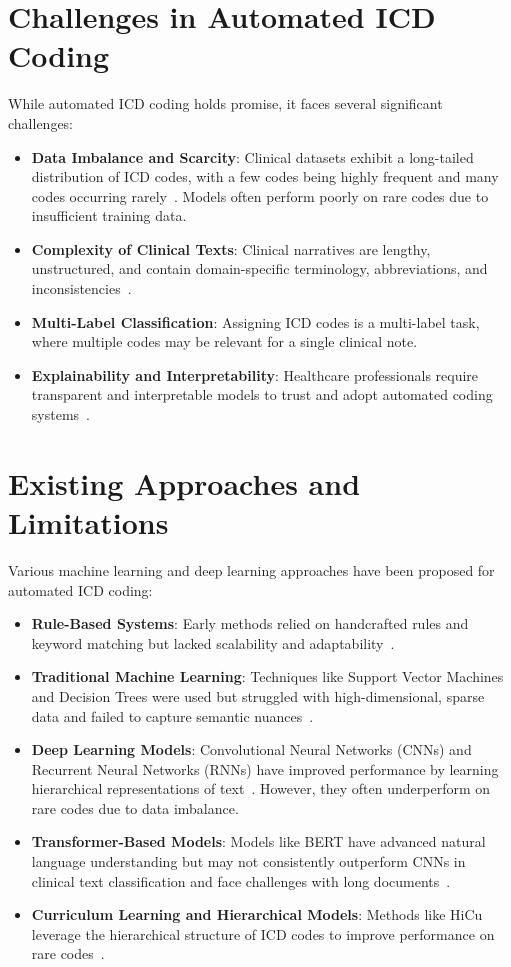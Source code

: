 \documentclass[12pt,a4paper]{report}
\begin{document}
\section{Challenges in Automated ICD Coding}
While automated ICD coding holds promise, it faces several significant challenges:
\begin{itemize}
    \item \textbf{Data Imbalance and Scarcity}: Clinical datasets exhibit a long-tailed distribution of ICD codes, with a few codes being highly frequent and many codes occurring rarely~\cite{rios2018few}. Models often perform poorly on rare codes due to insufficient training data.
    \item \textbf{Complexity of Clinical Texts}: Clinical narratives are lengthy, unstructured, and contain domain-specific terminology, abbreviations, and inconsistencies~\cite{wrenn2010quantifying}.
    \item \textbf{Multi-Label Classification}: Assigning ICD codes is a multi-label task, where multiple codes may be relevant for a single clinical note.
    \item \textbf{Explainability and Interpretability}: Healthcare professionals require transparent and interpretable models to trust and adopt automated coding systems~\cite{holzinger2017we}.
\end{itemize}

\section{Existing Approaches and Limitations}
Various machine learning and deep learning approaches have been proposed for automated ICD coding:
\begin{itemize}
    \item \textbf{Rule-Based Systems}: Early methods relied on handcrafted rules and keyword matching but lacked scalability and adaptability~\cite{farkas2008automatic}.
    \item \textbf{Traditional Machine Learning}: Techniques like Support Vector Machines and Decision Trees were used but struggled with high-dimensional, sparse data and failed to capture semantic nuances~\cite{perotte2014diagnosis}.
    \item \textbf{Deep Learning Models}: Convolutional Neural Networks (CNNs) and Recurrent Neural Networks (RNNs) have improved performance by learning hierarchical representations of text~\cite{mullenbach2018explainable, vu2020label}. However, they often underperform on rare codes due to data imbalance.
    \item \textbf{Transformer-Based Models}: Models like BERT have advanced natural language understanding but may not consistently outperform CNNs in clinical text classification and face challenges with long documents~\cite{dong2022automated, gao2021limitations}.
    \item \textbf{Curriculum Learning and Hierarchical Models}: Methods like HiCu leverage the hierarchical structure of ICD codes to improve performance on rare codes~\cite{ren2022hicu}.
\end{itemize}
\end{document}
